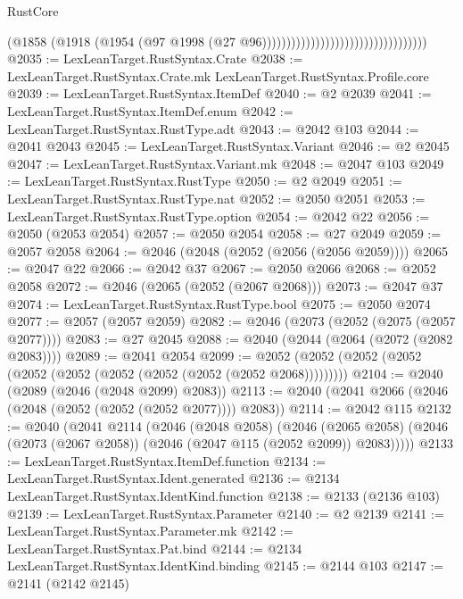 \begin{lexlean}{RustCore}
\begin{coremodule}
                                                              (@1858
                                                                (@1918
                                                                  (@1954
                                                                    (@97
                                                                      @1998
                                                                      (@27
                                                                        @96))))))))))))))))))))))))))))))))))
@2035 := LexLeanTarget.RustSyntax.Crate
@2038 := LexLeanTarget.RustSyntax.Crate.mk LexLeanTarget.RustSyntax.Profile.core
@2039 := LexLeanTarget.RustSyntax.ItemDef
@2040 := @2 @2039
@2041 := LexLeanTarget.RustSyntax.ItemDef.enum
@2042 := LexLeanTarget.RustSyntax.RustType.adt
@2043 := @2042 @103
@2044 := @2041 @2043
@2045 := LexLeanTarget.RustSyntax.Variant
@2046 := @2 @2045
@2047 := LexLeanTarget.RustSyntax.Variant.mk
@2048 := @2047 @103
@2049 := LexLeanTarget.RustSyntax.RustType
@2050 := @2 @2049
@2051 := LexLeanTarget.RustSyntax.RustType.nat
@2052 := @2050 @2051
@2053 := LexLeanTarget.RustSyntax.RustType.option
@2054 := @2042 @22
@2056 := @2050 (@2053 @2054)
@2057 := @2050 @2054
@2058 := @27 @2049
@2059 := @2057 @2058
@2064 := @2046 (@2048 (@2052 (@2056 (@2056 @2059))))
@2065 := @2047 @22
@2066 := @2042 @37
@2067 := @2050 @2066
@2068 := @2052 @2058
@2072 := @2046 (@2065 (@2052 (@2067 @2068)))
@2073 := @2047 @37
@2074 := LexLeanTarget.RustSyntax.RustType.bool
@2075 := @2050 @2074
@2077 := @2057 (@2057 @2059)
@2082 := @2046 (@2073 (@2052 (@2075 (@2057 @2077))))
@2083 := @27 @2045
@2088 := @2040 (@2044 (@2064 (@2072 (@2082 @2083))))
@2089 := @2041 @2054
@2099 := @2052 (@2052 (@2052 (@2052 (@2052 (@2052 (@2052 (@2052 (@2052 (@2052 @2068)))))))))
@2104 := @2040 (@2089 (@2046 (@2048 @2099) @2083))
@2113 := @2040 (@2041 @2066 (@2046 (@2048 (@2052 (@2052 (@2052 @2077)))) @2083))
@2114 := @2042 @115
@2132 := @2040
    (@2041
      @2114
      (@2046
        (@2048 @2058)
        (@2046
          (@2065 @2058)
          (@2046 (@2073 (@2067 @2058)) (@2046 (@2047 @115 (@2052 @2099)) @2083)))))
@2133 := LexLeanTarget.RustSyntax.ItemDef.function
@2134 := LexLeanTarget.RustSyntax.Ident.generated
@2136 := @2134 LexLeanTarget.RustSyntax.IdentKind.function
@2138 := @2133 (@2136 @103)
@2139 := LexLeanTarget.RustSyntax.Parameter
@2140 := @2 @2139
@2141 := LexLeanTarget.RustSyntax.Parameter.mk
@2142 := LexLeanTarget.RustSyntax.Pat.bind
@2144 := @2134 LexLeanTarget.RustSyntax.IdentKind.binding
@2145 := @2144 @103
@2147 := @2141 (@2142 @2145)

\end{coremodule}
\end{lexlean}
